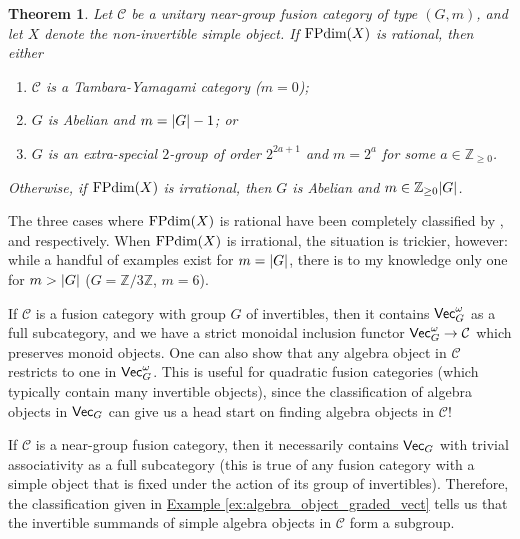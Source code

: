 \documentclass[12pt, reqno]{amsart}
\numberwithin{equation}{section}
\theoremstyle{plainspace}
\newtheorem{theorem}{Theorem}[section]
\theoremstyle{definitionspace}
\theoremstyle{remarkspace}
\DeclarePairedDelimiter{\abs}{\lvert}{\rvert}
\newcommand{\mathcat}[1]{\mathcal{#1}}
\newcommand{\textcat}[1]{\textup{\textsf{#1}}}
\newcommand{\FPdim}{\textup{FPdim}}
\begin{document}
\begin{theorem}\label{thm:near-group_multiplicity} \cite[Theorem 1.1]{Izumi_2015}
Let $\mathcat{C}$ be a unitary near-group fusion category of type $(G, m)$, and let $X$ denote the non-invertible simple object. If $\FPdim(X)$ is rational, then either
\begin{enumerate}[start=1, leftmargin=1.5cm, label={(\arabic*).}]
\item $\mathcat{C}$ is a {\em Tambara-Yamagami} category ($m = 0$);
\item $G$ is Abelian and $m = \abs{G} - 1$; or
\item $G$ is an extra-special $2$-group of order $2^{2a+1}$ and $m = 2^a$ for some $a \in \mathbb{Z}_{\geq 0}$.
\end{enumerate}
Otherwise, if $\FPdim(X)$ is irrational, then $G$ is Abelian and $m \in \mathbb{Z}_{\geq 0}\abs{G}$.
\end{theorem}
\leavevmode

\noindent The three cases where $\FPdim(X)$ is rational have been completely classified by \cite{Tambara_1998}, \cite{Evans_2014} and \cite{Izumi_2015} respectively. When $\FPdim(X)$ is irrational, the situation is trickier, however: while a handful of examples exist for $m = \abs{G}$, there is to my knowledge only one for $m > \abs{G}$ ($G = \mathbb{Z}/3\mathbb{Z}$, $m = 6$).
\newline

\noindent If $\mathcat{C}$ is a fusion category with group $G$ of invertibles, then it contains $\textcat{Vec}_G^{\omega}$ as a full subcategory, and we have a strict monoidal inclusion functor $\textcat{Vec}_G^{\omega} \to \mathcat{C}$ which preserves monoid objects. One can also show that any algebra object in $\mathcat{C}$ restricts to one in $\textcat{Vec}_G^{\omega}$. This is useful for quadratic fusion categories (which typically contain many invertible objects), since the classification of algebra objects in $\textcat{Vec}_G$ can give us a head start on finding algebra objects in $\mathcat{C}$!
\newpage

\noindent If $\mathcat{C}$ is a near-group fusion category, then it necessarily contains $\textcat{Vec}_G$ with trivial associativity as a full subcategory (this is true of any fusion category with a simple object that is fixed under the action of its group of invertibles). Therefore, the classification given in \hyperref[ex:algebra_object_graded_vect]{Example \ref*{ex:algebra_object_graded_vect}} tells us that the invertible summands of simple algebra objects in $\mathcat{C}$ form a subgroup.
\newline
\end{document}
